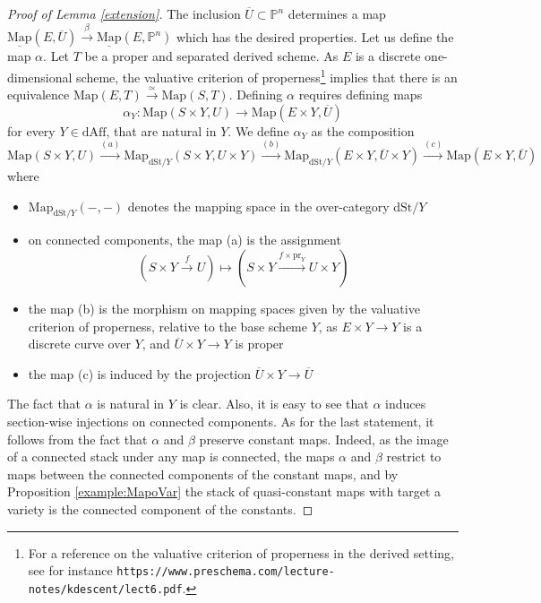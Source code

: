 \documentclass[11pt,letterpaper]{amsart}
\newcommand{\bP}{\mathbb{P}}
\newcommand{\Map}[2]{\underline{\mathrm{Map}}\left (#1,#2\right )}
\begin{document}
\begin{proof}[Proof of Lemma \ref{extension}]
The inclusion  $\overline{U} \subset \bP^n$ determines a map 
$\Map{E}{\overline{U}} \stackrel{\beta}\longrightarrow \Map{E}{\bP^n}$ which has the desired properties. Let us define the map $\alpha$. Let $T$ be a  proper and separated derived scheme. As $E$ is a discrete one-dimensional scheme, the valuative criterion of properness\footnote{For a reference on the valuative criterion of properness in the derived setting, see for instance {\tt https://www.preschema.com/lecture-notes/kdescent/lect6.pdf}.} implies that there is an equivalence $
\mathrm{Map}(E, T) \stackrel{\simeq}\to \mathrm{Map}(S, T)
$.  Defining $\alpha$ requires defining maps
$$
\alpha_Y: \mathrm{Map}(S \times Y, U) \to \mathrm{Map}(E \times Y, \overline{U})
$$
for every $Y \in \mathrm{dAff}$, that are natural in $Y$. We define $\alpha_Y$ as the composition 
 $$
\mathrm{Map}(S \times Y, U) \stackrel{(a)}\to \mathrm{Map}_{\mathrm{dSt}/Y}(S \times Y, U \times Y) \stackrel{(b)}\to 
\mathrm{Map}_{\mathrm{dSt}/Y}(E \times Y, \overline{U} \times Y) \stackrel{(c)}\to \mathrm{Map} (E \times Y, \overline{U})
$$
where  
\begin{itemize}
\item  $\mathrm{Map}_{\mathrm{dSt}/Y}(-,-)$ denotes the mapping space in the over-category $\mathrm{dSt}/Y$ 
\item on connected components, the map (a) is the assignment
$$(S \times Y \stackrel{f} \to U) \mapsto  (S \times Y \stackrel{f \times \mathrm{pr}_Y}\to U \times Y)$$
\item the map (b) is the morphism on mapping spaces given by the valuative criterion of properness, relative to the base scheme $Y$, as $E \times Y \to Y$ is a discrete curve over $Y$, and $\overline{U} \times Y \to Y$ is proper
\item the map (c) is induced by the projection $\overline{U} \times Y \to \overline{U}$
\end{itemize}
The fact that $\alpha$ is natural in $Y$ is clear. Also, it is easy to see that $\alpha$ induces section-wise injections on connected components. As for the last statement, it follows from the fact that $\alpha$ and $\beta$ preserve constant maps. Indeed, as the image of a connected stack under any map is connected, the maps $\alpha$ and $\beta$ restrict to maps between the connected components of the constant maps, and by Proposition \ref{example:MapoVar} the stack of quasi-constant maps with target a variety is the connected component of the constants.
\end{proof}
\end{document}
